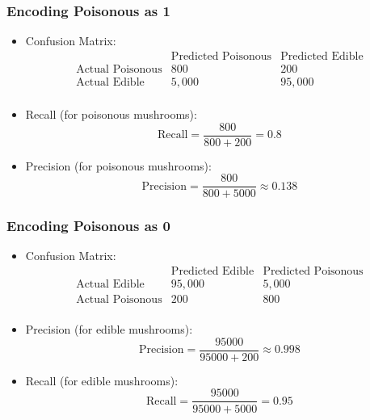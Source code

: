 \begin{notechapter}
\subsubsection{Encoding Poisonous as 1}
\begin{itemize}
    \item Confusion Matrix:
    \[
    \begin{array}{c|cc}
        & \text{Predicted Poisonous} & \text{Predicted Edible} \\
        \hline
        \text{Actual Poisonous} & 800 & 200 \\
        \text{Actual Edible} & 5,000 & 95,000 \\
    \end{array}
    \]
    \item Recall (for poisonous mushrooms):
    \[
    \text{Recall} = \frac{800}{800 + 200} = 0.8
    \]
    \item Precision (for poisonous mushrooms):
    \[
    \text{Precision} = \frac{800}{800 + 5000} \approx 0.138
    \]
\end{itemize}

\subsubsection{Encoding Poisonous as 0}
\begin{itemize}
    \item Confusion Matrix:
    \[
    \begin{array}{c|cc}
        & \text{Predicted Edible} & \text{Predicted Poisonous} \\
        \hline
        \text{Actual Edible} & 95,000 & 5,000 \\
        \text{Actual Poisonous} & 200 & 800 \\
    \end{array}
    \]
    \item Precision (for edible mushrooms):
    \[
    \text{Precision} = \frac{95000}{95000 + 200} \approx 0.998
    \]
    \item Recall (for edible mushrooms):
    \[
    \text{Recall} = \frac{95000}{95000 + 5000} = 0.95
    \]
\end{itemize}


\end{notechapter}
